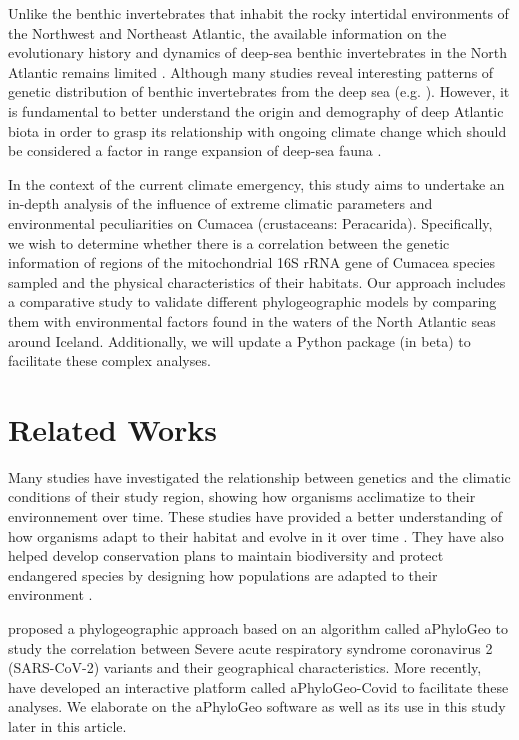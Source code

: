 Unlike the benthic invertebrates that inhabit the rocky intertidal environments of the Northwest and Northeast Atlantic, the available information on the evolutionary history and dynamics of deep-sea benthic invertebrates in the North Atlantic remains limited \citep{jennings_phylogeographic_2014}. Although many studies reveal interesting patterns of genetic distribution of benthic invertebrates from the deep sea (e.g. \citep{wilson_historical_1998, havermans_genetic_2013}). However, it is fundamental to better understand the origin and demography of deep Atlantic biota in order to grasp its relationship with ongoing climate change which should be considered a factor in range expansion of deep-sea fauna \citep{jennings_phylogeographic_2014}.

In the context of the current climate emergency, this study aims to undertake an in-depth analysis of the influence of extreme climatic parameters and environmental peculiarities on Cumacea (crustaceans: Peracarida). Specifically, we wish to determine whether there is a correlation between the genetic information of regions of the mitochondrial 16S rRNA gene of Cumacea species sampled and the physical characteristics of their habitats. Our approach includes a comparative study to validate different phylogeographic models by comparing them with environmental factors found in the waters of the North Atlantic seas around Iceland. Additionally, we will update a Python package (in beta) to facilitate these complex analyses.

\section{Related Works}\label{related-works}
Many studies have investigated the relationship between genetics and the climatic conditions of their study region, showing how organisms acclimatize to their environnement over time. These studies have provided a better understanding of how organisms adapt to their habitat and evolve in it over time \citep{fc_genomic_2012}. They have also helped develop conservation plans to maintain biodiversity and protect endangered species by designing how populations are adapted to their environment \citep{balkenhol_identifying_2009}.

\cite{koshkarov_phylogeography_2022} proposed a phylogeographic approach based on an algorithm called aPhyloGeo to study the correlation between Severe acute respiratory syndrome coronavirus 2 (SARS-CoV-2) variants and their geographical characteristics. More recently, \cite{li_aphylogeo-covid_2023} have developed an interactive platform called aPhyloGeo-Covid to facilitate these analyses.  We elaborate on the aPhyloGeo software as well as its use in this study later in this article.

